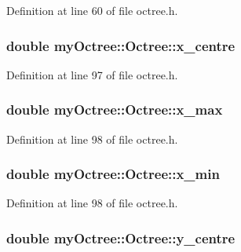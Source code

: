Definition at line 60 of file octree.\+h.

\hypertarget{classmy_octree_1_1_octree_afc540845d8c6d0db88f964d13126e52a}{}
\subsubsection[{x\+\_\+centre}]{\setlength{\rightskip}{0pt plus 5cm}double my\+Octree\+::\+Octree\+::x\+\_\+centre}\label{classmy_octree_1_1_octree_afc540845d8c6d0db88f964d13126e52a}


Definition at line 97 of file octree.\+h.

\hypertarget{classmy_octree_1_1_octree_a2a3291b5250cd29845ce2b8a6a4745d7}{}
\subsubsection[{x\+\_\+max}]{\setlength{\rightskip}{0pt plus 5cm}double my\+Octree\+::\+Octree\+::x\+\_\+max}\label{classmy_octree_1_1_octree_a2a3291b5250cd29845ce2b8a6a4745d7}


Definition at line 98 of file octree.\+h.

\hypertarget{classmy_octree_1_1_octree_af8b1fb4444afb1efc5cbcefc47443a58}{}
\subsubsection[{x\+\_\+min}]{\setlength{\rightskip}{0pt plus 5cm}double my\+Octree\+::\+Octree\+::x\+\_\+min}\label{classmy_octree_1_1_octree_af8b1fb4444afb1efc5cbcefc47443a58}


Definition at line 98 of file octree.\+h.

\hypertarget{classmy_octree_1_1_octree_aa771f7943a94365aadb387a596b37716}{}
\subsubsection[{y\+\_\+centre}]{\setlength{\rightskip}{0pt plus 5cm}double my\+Octree\+::\+Octree\+::y\+\_\+centre}\label{classmy_octree_1_1_octree_aa771f7943a94365aadb387a596b37716}


